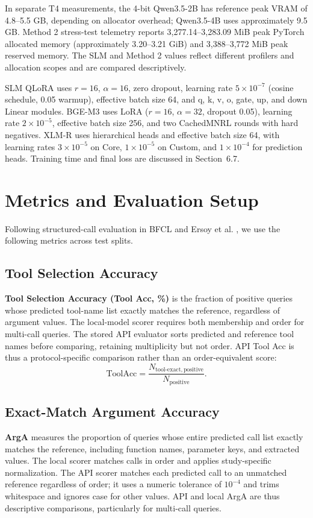 \documentclass[10pt,twocolumn,a4paper]{article}
\begin{document}
In separate T4 measurements, the 4-bit Qwen3.5-2B has reference peak VRAM of 4.8--5.5 GB, depending on allocator overhead; Qwen3.5-4B uses approximately 9.5 GB. Method 2 stress-test telemetry reports 3,277.14--3,283.09 MiB peak PyTorch allocated memory (approximately 3.20--3.21 GiB) and 3,388--3,772 MiB peak reserved memory. The SLM and Method 2 values reflect different profilers and allocation scopes and are compared descriptively.

SLM QLoRA uses $r=16$, $\alpha=16$, zero dropout, learning rate $5\times10^{-7}$ (cosine schedule, 0.05 warmup), effective batch size 64, and q, k, v, o, gate, up, and down Linear modules. BGE-M3 uses LoRA ($r=16$, $\alpha=32$, dropout 0.05), learning rate $2\times10^{-5}$, effective batch size 256, and two CachedMNRL rounds with hard negatives. XLM-R uses hierarchical heads and effective batch size 64, with learning rates $3\times10^{-5}$ on Core, $1\times10^{-5}$ on Custom, and $1\times10^{-4}$ for prediction heads. Training time and final loss are discussed in Section~6.7.

\section{Metrics and Evaluation Setup}
Following structured-call evaluation in BFCL \cite{yan2024bfcl} and Ersoy et al. \cite{ersoy2025tool}, we use the following metrics across test splits.

\subsection{Tool Selection Accuracy}
\textbf{Tool Selection Accuracy (Tool Acc, \%)} is the fraction of positive queries whose predicted tool-name list exactly matches the reference, regardless of argument values. The local-model scorer requires both membership and order for multi-call queries. The stored API evaluator sorts predicted and reference tool names before comparing, retaining multiplicity but not order. API Tool Acc is thus a protocol-specific comparison rather than an order-equivalent score:
\[\mathrm{ToolAcc}=\frac{N_{\mathrm{tool\text{-}exact,positive}}}{N_{\mathrm{positive}}}.\]

\subsection{Exact-Match Argument Accuracy}
\textbf{ArgA} measures the proportion of queries whose entire predicted call list exactly matches the reference, including function names, parameter keys, and extracted values. The local scorer matches calls in order and applies study-specific normalization. The API scorer matches each predicted call to an unmatched reference regardless of order; it uses a numeric tolerance of $10^{-4}$ and trims whitespace and ignores case for other values. API and local ArgA are thus descriptive comparisons, particularly for multi-call queries.
\end{document}
